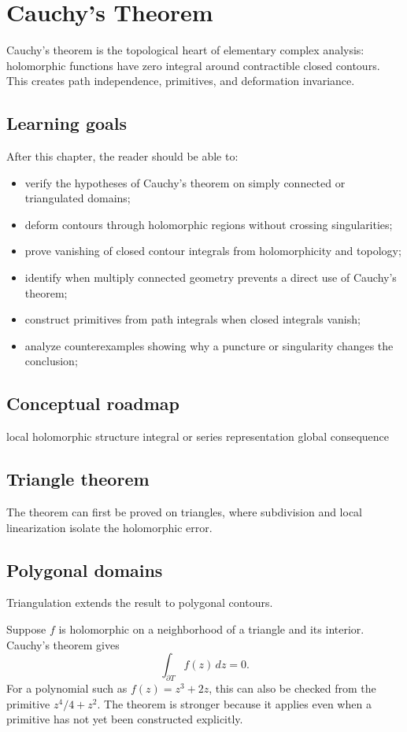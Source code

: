 \chapter{Cauchy's Theorem}
\label{ch:iv05}

Cauchy's theorem is the topological heart of elementary complex analysis: holomorphic functions have zero integral around contractible closed contours. This creates path independence, primitives, and deformation invariance.

\section*{Learning goals}
After this chapter, the reader should be able to:
\begin{itemize}
\item verify the hypotheses of Cauchy's theorem on simply connected or triangulated domains;
\item deform contours through holomorphic regions without crossing singularities;
\item prove vanishing of closed contour integrals from holomorphicity and topology;
\item identify when multiply connected geometry prevents a direct use of Cauchy's theorem;
\item construct primitives from path integrals when closed integrals vanish;
\item analyze counterexamples showing why a puncture or singularity changes the conclusion;
\end{itemize}
\section*{Conceptual roadmap}
\volroadmap
  {local holomorphic structure}
  {integral or series representation}
  {global consequence}

\section{Triangle theorem}
The theorem can first be proved on triangles, where subdivision and local linearization isolate the holomorphic error.

\section{Polygonal domains}
Triangulation extends the result to polygonal contours.

\begin{example}\label{ex:iv05-expand-01}
Suppose \(f\) is holomorphic on a neighborhood of a triangle and its interior. Cauchy's theorem gives
\[
\int_{\partial T}f(z)\,dz=0.
\]
For a polynomial such as \(f(z)=z^3+2z\), this can also be checked from the primitive \(z^4/4+z^2\). The theorem is stronger because it applies even when a primitive has not yet been constructed explicitly.
\end{example}
